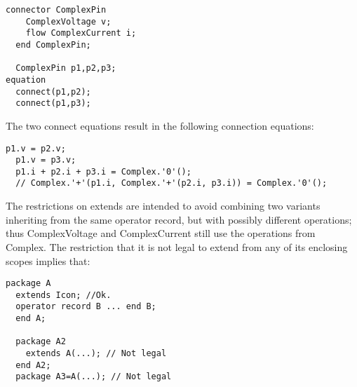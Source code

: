 \begin{example}
\begin{lstlisting}[language=modelica]
  connector ComplexPin
    ComplexVoltage v;
    flow ComplexCurrent i;
  end ComplexPin;

  ComplexPin p1,p2,p3;
equation
  connect(p1,p2);
  connect(p1,p3);
\end{lstlisting}
The two connect equations result in the following connection
equations:
\begin{lstlisting}[language=modelica]
  p1.v = p2.v;
  p1.v = p3.v;
  p1.i + p2.i + p3.i = Complex.'0'();
  // Complex.'+'(p1.i, Complex.'+'(p2.i, p3.i)) = Complex.'0'();
\end{lstlisting}
The restrictions on extends are intended to avoid combining two
variants inheriting from the same operator record, but with possibly
different operations; thus ComplexVoltage and ComplexCurrent still use
the operations from Complex. The restriction that it is not legal to
extend from any of its enclosing scopes implies that:
\begin{lstlisting}[language=modelica]
package A
  extends Icon; //Ok.
  operator record B ... end B;
  end A;

  package A2
    extends A(...); // Not legal
  end A2;
  package A3=A(...); // Not legal
\end{lstlisting}
\end{example}
